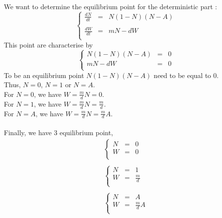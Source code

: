 \documentclass{article}
\begin{document}
\paragraph{}
We want to determine the equilibrium point for the deterministic part :
\[
\left\lbrace
\begin{array}{rcl}
\frac{dN}{dt} & = & N(1-N)(N-A) \\
\\
\frac{dW}{dt} & = & mN -dW \\
\end{array}
\right.
\]
This point are characterise by
\[
\left\lbrace
\begin{array}{rcl}
N(1-N)(N-A) & = & 0\\
mN -dW & = & 0\\
\end{array}
\right.
\]
To be an equilibrium point $N(1-N)(N-A)$ need to be equal to $0$. \\
Thus, $N = 0$, $N = 1$ or $N = A$. \\
For $N = 0$, we have $W = \frac{m}{d}N = 0$. \\
For $N = 1$, we have $W = \frac{m}{d}N = \frac{m}{d}$. \\
For $N = A$, we have $W = \frac{m}{d}N = \frac{m}{d}A$. \\

\paragraph{}
Finally, we have 3 equilibrium point,
\[
\begin{array}{c}
    \left\lbrace
    \begin{array}{rcl}
    N & = & 0 \\
    W & = & 0 \\
    \end{array}
    \right.
    \\
    \\
    \left\lbrace
    \begin{array}{rcl}
    N & = & 1 \\
    W & = & \frac{m}{d} \\
    \end{array}
    \right.
    \\
    \\
    \left\lbrace
    \begin{array}{rcl}
    N & = & A \\
    W & = & \frac{m}{d}A \\
    \end{array}
    \right.
\end{array}
\]
\end{document}
